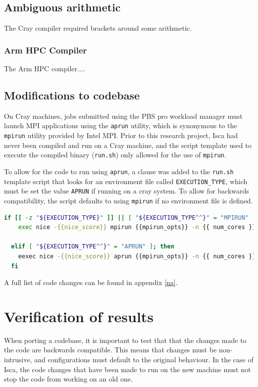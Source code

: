 \documentclass[a4paper,11pt]{report}
\begin{document}
\subsection{Ambiguous arithmetic}
The Cray compiler required brackets around some arithmetic. 





\subsubsection{Arm HPC Compiler}
The Arm HPC compiler....


\subsection{Modifications to codebase}
On Cray machines, jobs submitted using the PBS pro workload manager must launch MPI applications using the \texttt{aprun} utility, which is synonymous to the \texttt{mpirun} utility provided by Intel MPI. Prior to this research project, Isca had never been compiled and run on a Cray machine, and the script template used to execute the compiled binary (\texttt{run.sh}) only allowed for the use of \texttt{mpirun}.
\par
To allow for the code to run using \texttt{aprun}, a clause was added to the \texttt{run.sh} template script that looks for an environment file called \texttt{EXECUTION\_TYPE}, which must be set the value \texttt{APRUN} if running on a cray system. To allow for backwards compatibility, the script defaults to using \texttt{mpirun} if no environment file is defined. 

\begin{lstlisting}[language=bash]
  if [[ -z "${EXECUTION_TYPE}" ]] || [ "${EXECUTION_TYPE^^}" = "MPIRUN" ]; then
    exec nice -{{nice_score}} mpirun {{mpirun_opts}} -n {{ num_cores }} {{ execdir }}/{{ executable }}
    
  elif [ "${EXECUTION_TYPE^^}" = "APRUN" ]; then
    eexec nice -{{nice_score}} aprun {{mpirun_opts}} -n {{ num_cores }} {{ execdir }}/{{ executable }}
  fi
\end{lstlisting}
A full list of code changes can be found in appendix \ref{na}. 





\section{Verification of results}
When porting a codebase, it is important to test that that the changes made to the code are backwards compatible. This means that changes must be non-intrusive, and configurations must default to the original behaviour. In the case of Isca, the code changes that have been made to run on the new machine must not stop the code from working on an old one. 
\end{document}
